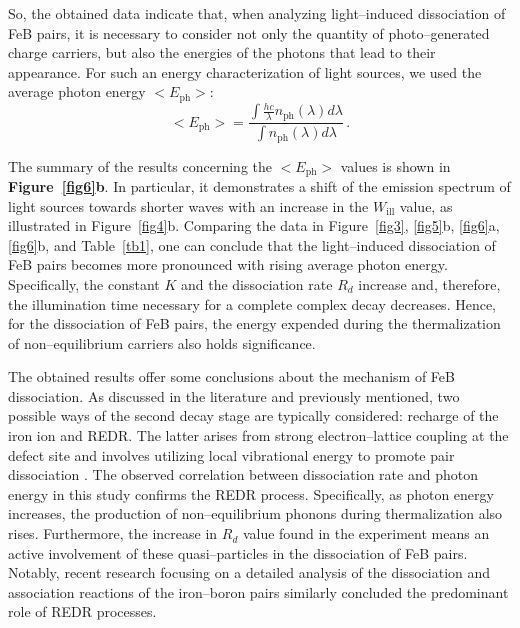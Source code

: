 \documentclass{WileyMSP-template}
\begin{document}
So, the obtained data indicate that, when analyzing light--induced dissociation of FeB pairs,
it is necessary to consider not only the quantity of photo--generated charge carriers,
but also the energies of the photons that lead to their appearance.
For such an energy characterization of light sources, we used the average photon energy $<E_\mathrm{ph}>$:
\begin{equation}
\label{eqEaver}
<E_\mathrm{ph}>=\frac{\int \frac{hc}{\lambda}n_\mathrm{ph}(\lambda)d\lambda}{\int n_\mathrm{ph}(\lambda)d\lambda}\,.
\end{equation}


The summary of the results concerning the $<E_\mathrm{ph}>$ values is shown in \textbf{Figure~\ref{fig6}b}.
In particular, it demonstrates a shift of the emission spectrum of light sources
towards shorter waves with an increase in the $W_\mathrm{ill}$ value, as illustrated in Figure~\ref{fig4}b.
Comparing the data in Figure~\ref{fig3}, \ref{fig5}b, \ref{fig6}a, \ref{fig6}b, and Table~\ref{tb1}, one can conclude that
the light--induced dissociation of FeB pairs becomes more pronounced with rising average photon energy.
Specifically, the constant $K$ and the dissociation rate $R_d$ increase and, therefore, the illumination time necessary for a complete complex decay decreases.
Hence, for the dissociation of FeB pairs, the energy expended during the thermalization of non--equilibrium carriers also holds significance.

The obtained results offer some conclusions about the mechanism of FeB dissociation.
As discussed in the literature and previously mentioned, two possible ways of the second decay stage
are typically considered: recharge of the iron ion and REDR.
The latter arises from strong electron--lattice coupling at the defect site and involves utilizing local vibrational energy to promote pair dissociation
\cite{FeBAssJAP2014,Sun2021,Macdonald2004}.
The observed correlation between dissociation rate and photon energy in this study confirms the REDR process.
Specifically, as photon energy increases, the production of non--equilibrium phonons during thermalization also rises.
Furthermore, the increase in $R_d$ value found in the experiment means an active involvement of these quasi--particles in the dissociation of FeB pairs.
Notably, recent research \cite{Sun2021} focusing on a detailed analysis of the dissociation and association reactions of the iron--boron pairs similarly concluded the predominant role of REDR processes.
\end{document}

